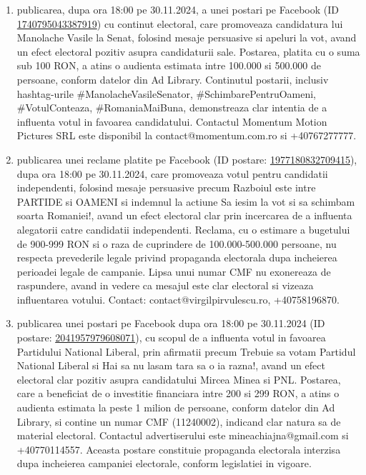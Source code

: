 \documentclass[a4paper,12pt]{article}
\begin{document}
\begin{enumerate}[leftmargin=*, label=\arabic*.)]
    \item publicarea, dupa ora 18:00 pe 30.11.2024, a unei postari pe Facebook (ID \href{https://www.facebook.com/ads/library/?id=1740795043387919}{1740795043387919}) cu continut electoral, care promoveaza candidatura lui Manolache Vasile la Senat, folosind mesaje persuasive si apeluri la vot, avand un efect electoral pozitiv asupra candidaturii sale. Postarea, platita cu o suma sub 100 RON, a atins o audienta estimata intre 100.000 si 500.000 de persoane, conform datelor din Ad Library.  Continutul postarii, inclusiv hashtag-urile \#ManolacheVasileSenator, \#SchimbarePentruOameni, \#VotulConteaza, \#RomaniaMaiBuna, demonstreaza clar intentia de a influenta votul in favoarea candidatului.  Contactul Momentum Motion Pictures SRL este disponibil la contact@momentum.com.ro si +40767277777.
    \item publicarea unei reclame platite pe Facebook (ID postare: \href{https://www.facebook.com/ads/library/?id=1977180832709415}{1977180832709415}), dupa ora 18:00 pe 30.11.2024, care promoveaza votul pentru candidatii independenti, folosind mesaje persuasive precum Razboiul este intre PARTIDE si OAMENI si indemnul la actiune Sa iesim la vot si sa schimbam soarta Romaniei!, avand un efect electoral clar prin incercarea de a influenta alegatorii catre candidatii independenti. Reclama, cu o estimare a bugetului de 900-999 RON si o raza de cuprindere de 100.000-500.000 persoane, nu respecta prevederile legale privind propaganda electorala dupa incheierea perioadei legale de campanie.  Lipsa unui numar CMF nu exonereaza de raspundere, avand in vedere ca mesajul este clar electoral si vizeaza influentarea votului. Contact: contact@virgilpirvulescu.ro, +40758196870.
    \item publicarea unei postari pe Facebook dupa ora 18:00 pe 30.11.2024 (ID postare: \href{https://www.facebook.com/ads/library/?id=2041957979608071}{2041957979608071}), cu scopul de a influenta votul in favoarea Partidului National Liberal,  prin afirmatii precum Trebuie sa votam Partidul National Liberal si Hai sa nu lasam tara sa o ia razna!,  avand un efect electoral clar pozitiv asupra candidatului Mircea Minea si PNL. Postarea, care a beneficiat de o investitie financiara intre 200 si 299 RON, a atins o audienta estimata la peste 1 milion de persoane, conform datelor din Ad Library, si contine un numar CMF (11240002), indicand clar natura sa de material electoral.  Contactul advertiserului este mineachiajna@gmail.com si +40770114557. Aceasta postare constituie propaganda electorala interzisa dupa incheierea campaniei electorale, conform legislatiei in vigoare.

\end{enumerate}
\end{document}

